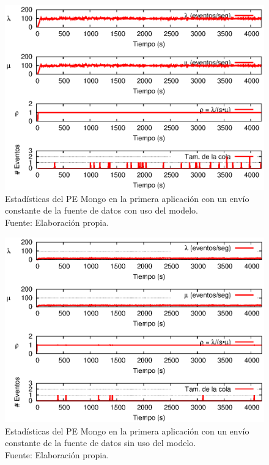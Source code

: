 \begin{figure}[!ht]
    \centering
    \captionsetup{justification=centering}
    \includegraphics[scale=1]{images/exp/app1/uniform/cm/statusMongoPE.eps}
    \caption[Estadísticas del PE Mongo en la primera aplicación con un envío constante de la fuente de datos con uso del modelo.]{Estadísticas del PE Mongo en la primera aplicación con un envío constante de la fuente de datos con uso del modelo.\\Fuente: Elaboración propia.}
    \label{fig:app1-uniform-statusMongoPE-cm}
\end{figure}

\begin{figure}[!ht]
    \centering
    \captionsetup{justification=centering}
    \includegraphics[scale=1]{images/exp/app1/uniform/sm/statusMongoPE.eps}
    \caption[Estadísticas del PE Mongo en la primera aplicación con un envío constante de la fuente de datos sin uso del modelo.]{Estadísticas del PE Mongo en la primera aplicación con un envío constante de la fuente de datos sin uso del modelo.\\Fuente: Elaboración propia.}
    \label{fig:app1-uniform-statusMongoPE-sm}
\end{figure}

